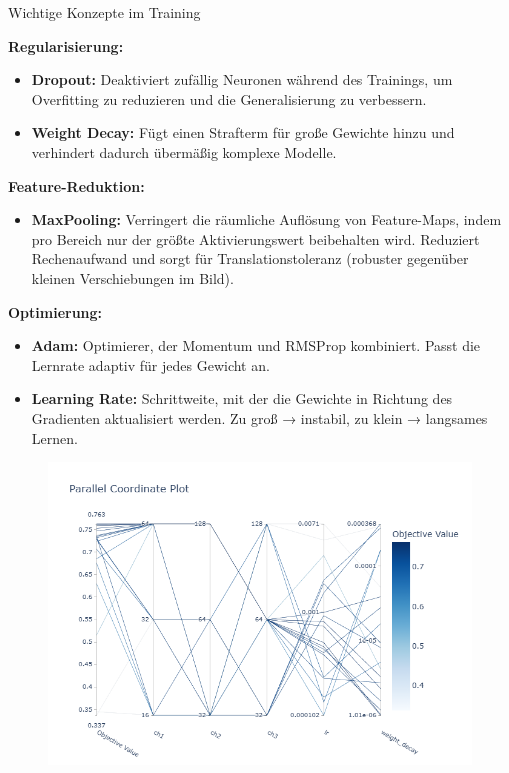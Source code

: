 \documentclass[
  fontsize=10pt, 
  aspectratio=169,
  xcolor={dvipsnames}
]{beamer}
\newlength{\imagewidth}
\newlength{\imageheight}
\newcommand{\improve}{%
    \textcolor{coloryellow}{IMPROVE}%
    \PackageWarning{JHstyle}{You used the 'improve' macro at this line. Remove it before finalising document}%
}
\begin{document}
\begin{frame}[allowframebreaks]{Wichtige Konzepte im Training}


\textbf{Regularisierung:}
\begin{itemize}
    \item \textbf{Dropout:} Deaktiviert zufällig Neuronen während des Trainings, um Overfitting zu reduzieren und die Generalisierung zu verbessern.
    \item \textbf{Weight Decay:} Fügt einen Strafterm für große Gewichte hinzu und verhindert dadurch übermäßig komplexe Modelle.
\end{itemize}

\textbf{Feature-Reduktion:}
\begin{itemize}
    \item \textbf{MaxPooling:} Verringert die räumliche Auflösung von Feature-Maps, indem pro Bereich nur der größte Aktivierungswert beibehalten wird.  
    Reduziert Rechenaufwand und sorgt für Translationstoleranz (robuster gegenüber kleinen Verschiebungen im Bild).
\end{itemize}

\textbf{Optimierung:}
\begin{itemize}
    \item \textbf{Adam:} Optimierer, der Momentum und RMSProp kombiniert. Passt die Lernrate adaptiv für jedes Gewicht an.
    \item \textbf{Learning Rate:} Schrittweite, mit der die Gewichte in Richtung des Gradienten aktualisiert werden.  
    Zu groß → instabil, zu klein → langsames Lernen.
\end{itemize}

\end{frame}

\begin{frame}
  \begin{figure}
    \centering
    \includegraphics[width=\imagewidth, height=\imageheight, keepaspectratio]{parallel_coordinate.png}
  \end{figure}
\end{frame}
\end{document}

